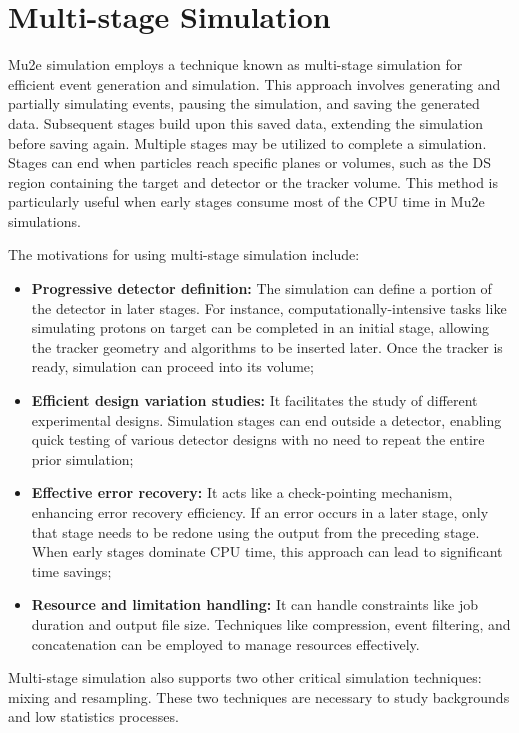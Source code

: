 \section{Multi-stage Simulation}

Mu2e simulation employs a technique known as multi-stage simulation for efficient event 
generation and simulation. This approach involves 
generating and partially simulating events, 
pausing the simulation, and saving the generated data. Subsequent stages build upon this saved 
data, extending the simulation before saving again. Multiple stages may be utilized to complete 
a simulation. Stages can end when particles reach specific planes or volumes, such as the DS 
region containing the target and detector or the tracker volume. This method is particularly 
useful when early stages consume most of the CPU time in Mu2e simulations.

The motivations for using multi-stage simulation include:

\begin{itemize}
    \item \textbf{Progressive detector definition:} The simulation can define a portion of the 
    detector in later stages. For instance, computationally-intensive tasks like simulating 
    protons on target can be completed in an initial stage, allowing the tracker geometry and 
    algorithms to be inserted later. Once the tracker is ready, simulation can proceed into 
    its volume;
    \item \textbf{Efficient design variation studies:} It facilitates the study of different 
    experimental designs. Simulation stages can end outside a detector, enabling quick testing 
    of various detector designs with no need to repeat the entire prior simulation;
    \item \textbf{Effective error recovery:} It acts like a check-pointing mechanism, enhancing 
    error recovery efficiency. If an error occurs in a later stage, only that stage needs to be 
    redone using the output from the preceding stage. When early stages dominate CPU time, this 
    approach can lead to significant time savings;
    \item \textbf{Resource and limitation handling:} It can handle constraints like job duration 
    and output file size. Techniques like compression, event filtering, and concatenation can be 
    employed to manage resources effectively.
\end{itemize}

Multi-stage simulation also supports two other critical simulation techniques: mixing and resampling. 
These two techniques are necessary to study backgrounds and low statistics processes.

